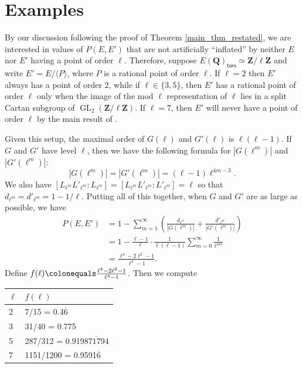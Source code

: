 \documentclass{amsart}
\newcommand{\Z}{\mathbf{Z}}
\newcommand{\Q}{\mathbf{Q}}
\newcommand{\GL}{\operatorname{GL}}
\newcommand{\tors}{\mathsf{tors}}
\numberwithin{equation}{section}
\theoremstyle{plain}
\theoremstyle{remark}
\begin{document}
\section{Examples}

By our discussion following the proof of Theorem \ref{main_thm_restated}, we are interested in values of $P(E,E')$ that are not artificially ``inflated'' by neither $E$ nor $E'$ having a point of order $\ell$.  Therefore, suppose $E(\Q)_\tors \simeq \Z/\ell\Z$ and write $E' = E/\langle P \rangle$, where $P$ is a rational point of order $\ell$.  If $\ell =2$ then $E'$ always has a point of order $2$, while if $\ell  \in \lbrace 3,5 \rbrace$, then $E'$ has a rational point of order $\ell$ only when the image of the mod $\ell$ representation of $\ell$ lies in a split Cartan subgroup of $\GL_2(\Z/\ell\Z)$.  If $\ell=7$, then $E'$ will never have a point of order $\ell$ by the main result of \cite{greenberg7}.

Given this setup, the maximal order of $G(\ell)$ and $G'(\ell)$ is $\ell(\ell-1)$.   If $G$ and $G'$ have level $\ell$, then we have the following formula for $|G(\ell^m)|$ and $|G'(\ell^m)|$:
\[
|G(\ell^m)| = |G'(\ell^m)| = (\ell-1)\ell^{4m-3}.
\]
We also have $[L_{\ell^m}L'_{\ell^m}:L_{\ell^m}] = [L_{\ell^m}L'_{\ell^m}:L'_{\ell^m}] = \ell$ so that $d_{\ell^m} = d'_{\ell^m} = 1-1/\ell$.  Putting all of this together, when $G$ and $G'$ are as large as possible, we have
\begin{align*}
P(E,E') &=  1 - \sum_{m = 1}^\infty \left(\frac{d_{\ell^m}}{|G(\ell^m)|}  +  \frac{d'_{\ell^m}}{|G'(\ell^m)|}\right) \\
&= 1 - \frac{\ell-1}{\ell} \cdot \frac{1}{\ell(\ell-1)} \sum_{m = 0}^\infty \frac{1}{\ell^{4m}} \\
&= \frac{\ell^4 - 2\ell^2 -1}{\ell^4-1}.
\end{align*}
Define $f(\ell) \colonequals \frac{\ell^4 - 2\ell^2 -1}{\ell^4-1}$.  Then we compute
\begin{center}
\begin{tabular}{|ll|}
\hline
$\ell$ & $f(\ell)$ \\
\hline
2 & 7/15 = 0.4$\overline{6}$ \\
3 & 31/40 = 0.775\\
5 & 287/312 = 0.919$\overline{871794}$\\
7 & 1151/1200 = 0.9591$\overline{6}$\\
\hline
\end{tabular}
\end{center}
\end{document}
